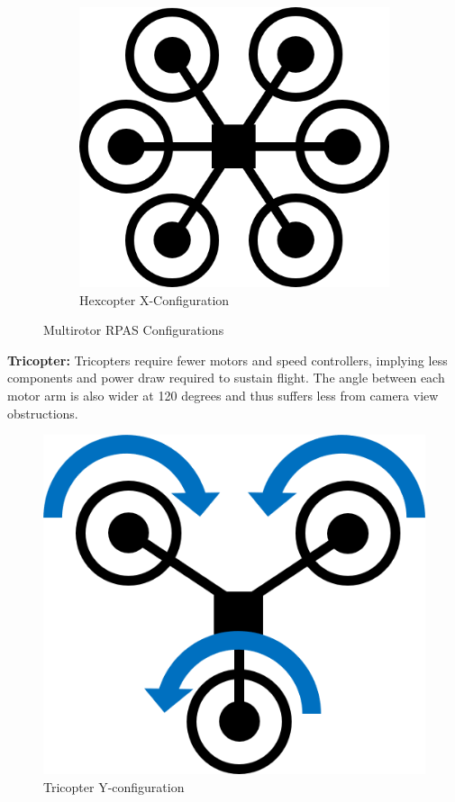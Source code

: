\begin{figure}[b]
\begin{subfigure}[b]{0.3\textwidth}
        \includegraphics[scale=0.4]{img/drone_hexconfig}
        \caption{Hexcopter X-Configuration}
        \label{fig:hexcopter-x}
    \end{subfigure}
    
    \caption{Multirotor RPAS Configurations}
    \label{fig:rpas-config}
\end{figure}

\textbf{Tricopter:} Tricopters require fewer motors and speed controllers, implying less components and power draw required to sustain flight. The angle between each motor arm is also wider at 120 degrees and thus suffers less from camera view obstructions. 

\begin{figure}[h]
    \centering
    \includegraphics[scale=0.4]{img/drone_yconfigt}
    \caption{Tricopter Y-configuration}
    \label{fig:tricopter-y-t}
\end{figure}

